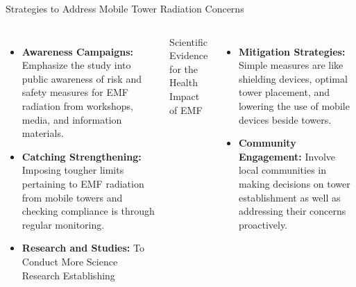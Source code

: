 \documentclass[7pt, aspectratio=169]{beamer}
\begin{document}
\begin{frame}{Strategies to Address Mobile Tower Radiation Concerns}
\begin{columns}
    \begin{itemize}
        \item \textbf{Awareness Campaigns:} Emphasize the study into public awareness of risk and safety measures for EMF radiation from workshops, media, and information materials.
        \item \textbf{Catching Strengthening:} Imposing tougher limits pertaining to EMF radiation from mobile towers and checking compliance is through regular monitoring.
        \item \textbf{Research and Studies:} To Conduct More Science Research Establishing 

    \end{itemize}

    
    \hspace{0.6cm} Scientific Evidence for the Health Impact\\
    \hspace{0.6cm} of EMF\\
    \begin{itemize}
        \item \textbf{Mitigation Strategies:} Simple measures are like shielding devices, optimal tower placement, and lowering the use of mobile devices beside towers.
        \item \textbf{Community Engagement:} Involve local communities in making decisions on tower establishment as well as addressing their concerns proactively.
    \end{itemize}

    
\end{columns}
    
\end{frame}
\end{document}
